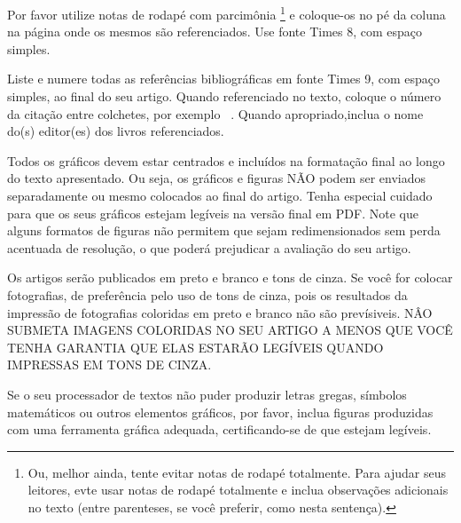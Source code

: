 \documentclass[10pt,twocolumn]{article}
\begin{document}
Por favor utilize notas de rodapé com parcimônia%
\footnote
   {%
     Ou, melhor ainda, tente evitar notas de rodapé totalmente.  Para ajudar seus
     leitores, evte usar notas de rodapé totalmente e inclua observações adicionais
     no texto (entre parenteses, se você preferir, como nesta sentença). 
   }
e coloque-os no pé da coluna na página onde os mesmos são referenciados. 
Use fonte Times 8, com espaço simples. 



Liste e numere todas as referências bibliográficas em fonte Times 9, 
com espaço simples, ao final do seu artigo. Quando referenciado no texto, 
coloque o número da citação entre colchetes, por exemplo ~\cite{ex1}. 
Quando apropriado,inclua o nome do(s) editor(es) dos livros referenciados. 


Todos os gráficos devem estar centrados e incluídos na formatação final 
ao longo do texto apresentado. Ou seja, os gráficos e figuras NÃO podem 
ser enviados separadamente ou mesmo colocados ao final do artigo. Tenha 
especial cuidado para que os seus gráficos estejam legíveis na versão 
final em PDF. Note que alguns formatos de figuras não permitem 
que sejam redimensionados sem perda acentuada de resolução, o que poderá
prejudicar a avaliação do seu artigo. 


Os artigos serão publicados em preto e branco e tons de cinza. Se você 
for colocar fotografias, de preferência pelo uso de tons de cinza, 
pois os resultados da impressão de fotografias coloridas em preto e 
branco não são prevísiveis.
NÂO SUBMETA IMAGENS COLORIDAS NO SEU ARTIGO A MENOS QUE VOCÊ TENHA 
GARANTIA QUE ELAS ESTARÃO LEGÍVEIS QUANDO IMPRESSAS EM TONS DE CINZA. 


Se o seu processador de textos não puder produzir letras gregas, símbolos 
matemáticos ou outros elementos gráficos, por favor, inclua figuras produzidas
com uma ferramenta gráfica adequada, certificando-se de que estejam legíveis. 

\end{document}
